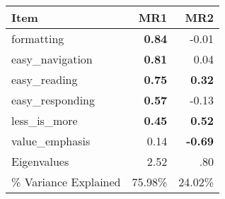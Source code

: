 \begin{tabular}{lrr}
\toprule
Item & MR1 & MR2 \\ 
\midrule\addlinespace[2.5pt]
formatting & \textbf{0.84} & -0.01 \\ 
easy\_navigation & \textbf{0.81} & 0.04 \\ 
easy\_reading & \textbf{0.75} & \textbf{0.32} \\ 
easy\_responding & \textbf{0.57} & -0.13 \\ 
less\_is\_more & \textbf{0.45} & \textbf{0.52} \\ 
value\_emphasis & 0.14 & \textbf{-0.69} \\ 
\midrule
Eigenvalues & 2.52 & .80 \\ 
\% Variance Explained & 75.98\% & 24.02\% \\ 
\bottomrule
\end{tabular}

